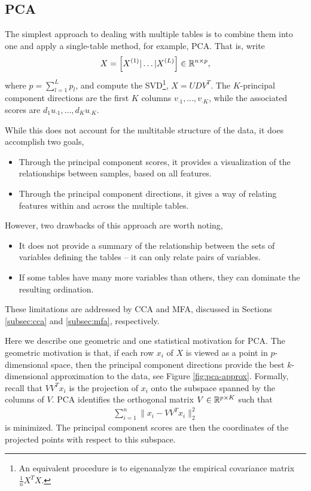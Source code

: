 \documentclass{article}
\begin{document}
\subsection{PCA}
\label{subsec:pca}

The simplest approach to dealing with multiple tables is to combine them into
one and apply a single-table method, for example, PCA. That is, write
\begin{align}
X = \left[X^{(1)} \vert \dots \vert X^{(L)}\right] \in \mathbb{R}^{n \times p},
\end{align}
where $p = \sum_{l = 1}^{L}p_{l}$, and compute the SVD\footnote{An equivalent
  procedure is to eigenanalyze the empirical covariance matrix
  $\frac{1}{n}X^{T}X$.}, $X = UDV^{T}$. The $K$-principal component directions
are the first $K$ columns $v_{\cdot 1}, \dots, v_{\cdot K}$, while the
associated scores are $d_{1}u_{\cdot 1}, \dots, d_{K}u_{\cdot K}$.

While this does not account for the multitable structure of the data, it does
accomplish two goals,
\begin{itemize}
\item Through the principal component scores, it provides a visualization of the
  relationships between samples, based on all features.
\item Through the principal component directions, it gives a way of relating
  features within and across the multiple tables.
\end{itemize}

However, two drawbacks of this approach are worth noting,
\begin{itemize}
  \item It does not provide a summary of the relationship between the sets of
    variables defining the tables -- it can only relate pairs of
    variables. \label{bullet:pca_drawback_one}
  \item If some tables have many more variables than others, they can dominate
    the resulting ordination. \label{bullet:pca_drawback_two}
\end{itemize}

These limitations are addressed by CCA and MFA, discussed in Sections
\ref{subsec:cca} and \ref{subsec:mfa}, respectively.

Here we describe one geometric and one statistical motivation for PCA. The
geometric motivation is that, if each row $x_{i}$ of $X$ is viewed as a point in
$p$-dimensional space, then the principal component directions provide the best
$k$-dimensional approximation to the data, see Figure \ref{fig:pca-approx}.
Formally, recall that $VV^{T}x_{i}$ is the projection of $x_{i}$ onto the
subspace spanned by the columns of $V$. PCA identifies the orthogonal matrix $V
\in \mathbb{R}^{p \times K}$ such that
\begin{align}
\sum_{i = 1}^{n}\|x_{i} - VV^{T} x_{i}\|_{2}^{2}
\end{align}
is minimized. The principal component scores are then the coordinates of the
projected points with respect to this subspace.
\end{document}
